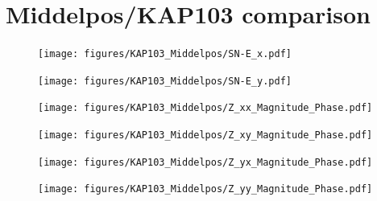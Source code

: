 \documentclass{article}
\begin{document}
\clearpage

\section{Middelpos/KAP103 comparison}

\begin{figure}[h!]
\centering
\texttt{[image: figures/KAP103\_Middelpos/SN-E\_x.pdf]}
\caption{}
\label{fig:universe}
\end{figure}

\begin{figure}[h!]
\centering
\texttt{[image: figures/KAP103\_Middelpos/SN-E\_y.pdf]}
\caption{}
\label{fig:universe}
\end{figure}

\clearpage

\begin{figure}[h!]
\centering
\texttt{[image: figures/KAP103\_Middelpos/Z\_xx\_Magnitude\_Phase.pdf]}
\caption{}
\label{fig:universe}
\end{figure}

\begin{figure}[h!]
\centering
\texttt{[image: figures/KAP103\_Middelpos/Z\_xy\_Magnitude\_Phase.pdf]}
\caption{}
\label{fig:universe}
\end{figure}

\clearpage

\begin{figure}[h!]
\centering
\texttt{[image: figures/KAP103\_Middelpos/Z\_yx\_Magnitude\_Phase.pdf]}
\caption{}
\label{fig:universe}
\end{figure}

\begin{figure}[h!]
\centering
\texttt{[image: figures/KAP103\_Middelpos/Z\_yy\_Magnitude\_Phase.pdf]}
\caption{}
\label{fig:universe}
\end{figure}
\end{document}
